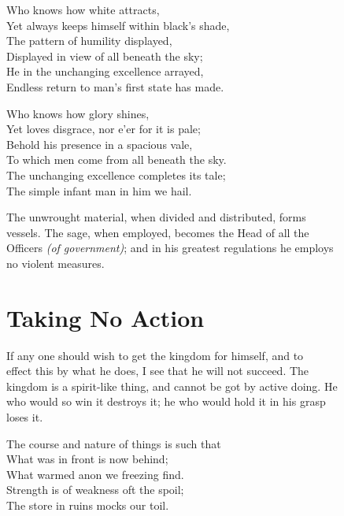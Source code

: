     Who knows how white attracts,\\
    Yet always keeps himself within black's shade,\\
    The pattern of humility displayed,\\
    Displayed in view of all beneath the sky;\\
    He in the unchanging excellence arrayed,\\
    Endless return to man's first state has made.\vspace{\baselineskip}
    
    Who knows how glory shines,\\
    Yet loves disgrace, nor e'er for it is pale;\\
    Behold his presence in a spacious vale,\\
    To which men come from all beneath the sky.\\
    The unchanging excellence completes its tale;\\
    The simple infant man in him we hail.\vspace{\baselineskip}
    
    The unwrought material, when divided and distributed, forms\\
    vessels. The sage, when employed, becomes the Head of all the\\
    Officers \textit{(of government)}; and in his greatest regulations he employs\\
    no violent measures.\vspace{\baselineskip}
\section*{Taking No Action}
    If any one should wish to get the kingdom for himself, and to\\
    effect this by what he does, I see that he will not succeed. The\\
    kingdom is a spirit-like thing, and cannot be got by active doing. He\\
    who would so win it destroys it; he who would hold it in his grasp\\
    loses it.\vspace{\baselineskip}
    
    The course and nature of things is such that\\
    What was in front is now behind;\\
    What warmed anon we freezing find.\\
    Strength is of weakness oft the spoil;\\
    The store in ruins mocks our toil.\vspace{\baselineskip}
    
